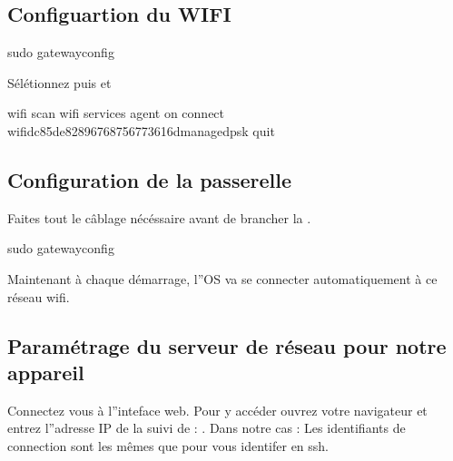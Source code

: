 \documentclass[letterpaper,10pt,french]{sphinxmanual}
\begin{document}
\subsection{Configuartion du WIFI}
\label{\detokenize{AnnexeA:configuartion-du-wifi}}
\begin{sphinxVerbatim}[commandchars=\\\{\}]
   sudo gateway\PYGZhy{}config
\end{sphinxVerbatim}

Sélétionnez  puis  et 

\begin{sphinxVerbatim}[commandchars=\\\{\}]
 wifi 
scan wifi
services 
agent on
connect wifi\PYGZus{}dc85de828967\PYGZus{}68756773616d\PYGZus{}managed\PYGZus{}psk
quit
\end{sphinxVerbatim}


\subsection{Configuration de la passerelle}
\label{\detokenize{AnnexeA:configuration-de-la-passerelle}}
Faites tout le câblage nécéssaire avant de brancher la .


\begin{sphinxVerbatim}[commandchars=\\\{\}]
sudo gateway\PYGZhy{}config
\end{sphinxVerbatim}

Maintenant à chaque démarrage, l”OS va se connecter automatiquement à ce réseau wifi.


\subsection{Paramétrage du serveur de réseau pour notre appareil}
\label{\detokenize{AnnexeA:parametrage-du-serveur-de-reseau-pour-notre-appareil}}
Connectez vous à l”inteface web. Pour y accéder ouvrez votre navigateur et entrez l”adresse IP de la  suivi de : . Dans notre cas :  Les identifiants de connection sont les mêmes que pour vous identifer en ssh.
\end{document}
